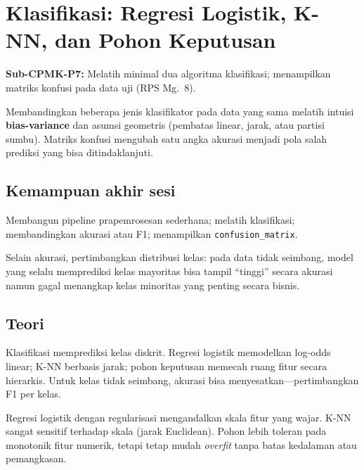\documentclass[../main.tex]{subfiles}
\begin{document}
\chapter{Klasifikasi: Regresi Logistik, K-NN, dan Pohon Keputusan}

\begin{subcpmk}
  \item \textbf{Sub-CPMK-P7:} Melatih minimal dua algoritma klasifikasi; menampilkan matriks konfusi pada data uji (RPS Mg.\ 8).
\end{subcpmk}


\noindent Membandingkan beberapa jenis klasifikator pada data yang sama melatih intuisi \textbf{bias-variance} dan asumsi geometris (pembatas linear, jarak, atau partisi sumbu). Matriks konfusi mengubah satu angka akurasi menjadi pola salah prediksi yang bisa ditindaklanjuti.

\section{Kemampuan akhir sesi}

Membangun pipeline prapemrosesan sederhana; melatih klasifikasi; membandingkan akurasi atau F1; menampilkan \texttt{confusion\_matrix}.

Selain akurasi, pertimbangkan distribusi kelas: pada data tidak seimbang, model yang selalu memprediksi kelas mayoritas bisa tampil ``tinggi'' secara akurasi namun gagal menangkap kelas minoritas yang penting secara bisnis.

\section{Teori}

\begin{konsep}
Klasifikasi memprediksi kelas diskrit. Regresi logistik memodelkan log-odds linear; K-NN berbasis jarak; pohon keputusan memecah ruang fitur secara hierarkis. Untuk kelas tidak seimbang, akurasi bisa menyesatkan---pertimbangkan F1 per kelas.
\end{konsep}

Regresi logistik dengan regularisasi mengandalkan skala fitur yang wajar. K-NN sangat sensitif terhadap skala (jarak Euclidean). Pohon lebih toleran pada monotonik fitur numerik, tetapi tetap mudah \textit{overfit} tanpa batas kedalaman atau pemangkasan.


\end{document}
